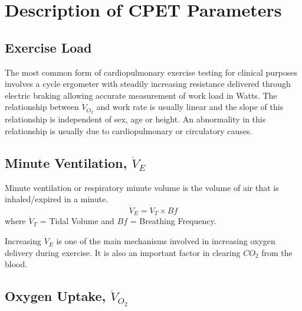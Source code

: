 \section{Description of CPET Parameters}


\subsection{Exercise Load}
The most common form of cardiopulmonary exercise testing for clinical purposes involves a cycle ergometer with steadily increasing resistance delivered through electric braking allowing accurate measurement of work load in Watts. The relationship between $\dot{V}_{O_2}$ and work rate is usually linear and the slope of this relationship is independent of sex, age or height. An abnormality in this relationship is usually due to cardiopulmonary or circulatory causes.

\subsection{Minute Ventilation, $\dot{V}_E$}
Minute ventilation or respiratory minute volume is the volume of air that is inhaled/expired in a minute.
\begin{equation} \label{eq:VE=VTxBf}
	\dot{V}_E = \dot{V}_T \times Bf
\end{equation}
where $\dot{V}_T$ = Tidal Volume and $Bf$ = Breathing Frequency.

Increasing $\dot{V}_E$ is one of the main mechanisms involved in increasing oxygen delivery during exercise. It is also an important factor in clearing $CO_2$ from the blood.

\subsection{Oxygen Uptake, $\dot{V}_{O_2}$}

